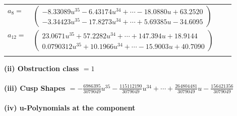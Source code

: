 \documentclass[1p]{elsarticle_modified}
\theoremstyle{definition}
\begin{document}
\begin{tabular}{m{7pt} m{180pt} m{7pt} m{180pt} }
\flushright $a_{8}=$&$\begin{pmatrix}-8.33089 u^{35}-6.43174 u^{34}+\cdots-18.0880 u+63.2520\\-3.34423 u^{35}-17.8273 u^{34}+\cdots+5.69385 u-34.6095\end{pmatrix}$ \\
\flushright $a_{12}=$&$\begin{pmatrix}23.0671 u^{35}+57.2282 u^{34}+\cdots+147.394 u+18.9144\\0.0790312 u^{35}+10.1966 u^{34}+\cdots-15.9003 u+40.7090\end{pmatrix}$\\&\end{tabular}
\flushleft \textbf{(ii) Obstruction class $= 1$}\\~\\
\flushleft \textbf{(iii) Cusp Shapes $= -\frac{6986395}{3079049} u^{35}-\frac{115112190}{3079049} u^{34}+\cdots+\frac{264804481}{3079049} u-\frac{156421356}{3079049}$}\\~\\
\newpage\renewcommand{\arraystretch}{1}
\flushleft \textbf{(iv) u-Polynomials at the component}\newline \\
\end{document}
